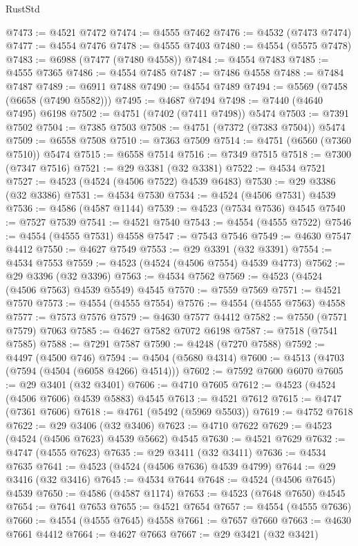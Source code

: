 \begin{lexlean}{RustStd}
\begin{coremodule}
@7473 := @4521 @7472
@7474 := @4555 @7462
@7476 := @4532 (@7473 @7474)
@7477 := @4554 @7476
@7478 := @4555 @7403
@7480 := @4554 (@5575 @7478)
@7483 := @6988 (@7477 (@7480 @4558))
@7484 := @4554 @7483
@7485 := @4555 @7365
@7486 := @4554 @7485
@7487 := @7486 @4558
@7488 := @7484 @7487
@7489 := @6911 @7488
@7490 := @4554 @7489
@7494 := @5569 (@7458 (@6658 (@7490 @5582)))
@7495 := @4687 @7494
@7498 := @7440 (@4640 @7495) @6198
@7502 := @4751 (@7402 (@7411 @7498)) @5474
@7503 := @7391 @7502
@7504 := @7385 @7503
@7508 := @4751 (@7372 (@7383 @7504)) @5474
@7509 := @6558 @7508
@7510 := @7363 @7509
@7514 := @4751 (@6560 (@7360 @7510)) @5474
@7515 := @6558 @7514
@7516 := @7349 @7515
@7518 := @7300 (@7347 @7516)
@7521 := @29 @3381 (@32 @3381)
@7522 := @4534 @7521
@7527 := @4523 (@4524 (@4506 @7522) @4539 @6483)
@7530 := @29 @3386 (@32 @3386)
@7531 := @4534 @7530
@7534 := @4524 (@4506 @7531) @4539
@7536 := @4586 (@4587 @1144)
@7539 := @4523 (@7534 @7536) @4545
@7540 := @7527 @7539
@7541 := @4521 @7540
@7543 := @4554 (@4555 @7522)
@7546 := @4554 (@4555 @7531) @4558
@7547 := @7543 @7546
@7549 := @4630 @7547 @4412
@7550 := @4627 @7549
@7553 := @29 @3391 (@32 @3391)
@7554 := @4534 @7553
@7559 := @4523 (@4524 (@4506 @7554) @4539 @4773)
@7562 := @29 @3396 (@32 @3396)
@7563 := @4534 @7562
@7569 := @4523 (@4524 (@4506 @7563) @4539 @5549) @4545
@7570 := @7559 @7569
@7571 := @4521 @7570
@7573 := @4554 (@4555 @7554)
@7576 := @4554 (@4555 @7563) @4558
@7577 := @7573 @7576
@7579 := @4630 @7577 @4412
@7582 := @7550 (@7571 @7579) @7063
@7585 := @4627 @7582 @7072 @6198
@7587 := @7518 (@7541 @7585)
@7588 := @7291 @7587
@7590 := @4248 (@7270 @7588)
@7592 := @4497 (@4500 @746)
@7594 := @4504 (@5680 @4314)
@7600 := @4513 (@4703 (@7594 (@4504 (@6058 @4266) @4514)))
@7602 := @7592 @7600 @6070
@7605 := @29 @3401 (@32 @3401)
@7606 := @4710 @7605
@7612 := @4523 (@4524 (@4506 @7606) @4539 @5883) @4545
@7613 := @4521 @7612
@7615 := @4747 (@7361 @7606)
@7618 := @4761 (@5492 (@5969 @5503))
@7619 := @4752 @7618
@7622 := @29 @3406 (@32 @3406)
@7623 := @4710 @7622
@7629 := @4523 (@4524 (@4506 @7623) @4539 @5662) @4545
@7630 := @4521 @7629
@7632 := @4747 (@4555 @7623)
@7635 := @29 @3411 (@32 @3411)
@7636 := @4534 @7635
@7641 := @4523 (@4524 (@4506 @7636) @4539 @4799)
@7644 := @29 @3416 (@32 @3416)
@7645 := @4534 @7644
@7648 := @4524 (@4506 @7645) @4539
@7650 := @4586 (@4587 @1174)
@7653 := @4523 (@7648 @7650) @4545
@7654 := @7641 @7653
@7655 := @4521 @7654
@7657 := @4554 (@4555 @7636)
@7660 := @4554 (@4555 @7645) @4558
@7661 := @7657 @7660
@7663 := @4630 @7661 @4412
@7664 := @4627 @7663
@7667 := @29 @3421 (@32 @3421)

\end{coremodule}
\end{lexlean}
